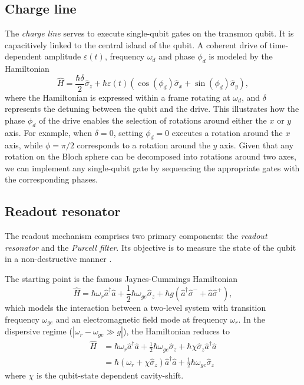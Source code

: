 \subsection{Charge line}

The \emph{charge line} serves to execute single-qubit gates on the transmon qubit.
It is capacitively linked to the central island of the qubit.
A coherent drive of time-dependent amplitude $\varepsilon(t)$, frequency $\omega_d$ and phase $\phi_d$ is modeled by the Hamiltonian \cite{LC_resonator}
\begin{equation}
    \hat{H} = \frac{\hbar \delta}{2} \hat{\sigma}_z + 
    \hbar \varepsilon(t) \left( \cos(\phi_d) \hat{\sigma}_x + \sin(\phi_d) \hat{\sigma}_y \right) ,
\end{equation}
where the Hamiltonian is expressed within a frame rotating at $\omega_d$, and $\delta$ represents the detuning between the qubit and the drive. 
This illustrates how the phase $\phi_d$ of the drive enables the selection of rotations around either the $x$ or $y$ axis. 
For example, when $\delta = 0$, setting $\phi_d = 0$ executes a rotation around the $x$ axis, while $\phi = \pi/2$ corresponds to a rotation around the $y$ axis. 
Given that any rotation on the Bloch sphere can be decomposed into rotations around two axes, we can implement any single-qubit gate by sequencing the appropriate gates with the corresponding phases.

\subsection{Readout resonator}

The readout mechanism comprises two primary components: the \emph{readout resonator} and the \emph{Purcell filter}. 
Its objective is to measure the state of the qubit in a non-destructive manner \cite{singleshot_readout}.

The starting point is the famous Jaynes-Cummings Hamiltonian \cite{haroche2006exploring}
\begin{equation}
    \hat{H} = \hbar \omega_r \hat{a}^\dagger \hat{a} + \frac{1}{2} \hbar \omega_{ge} \hat{\sigma}_z + \hbar g (\hat{a}^\dagger \hat{\sigma}^- + \hat{a} \hat{\sigma}^+) ,
\end{equation}
which models the interaction between a two-level system with transition frequency $\omega_{ge}$ and an electromagnetic field mode at frequency $\omega_r$.
In the dispersive regime ($|\omega_r - \omega_{ge} \gg g|$), the Hamiltonian reduces to \cite{transmon_regime}
\begin{align}
    \hat{H} &= \hbar \omega_r \hat{a}^\dagger \hat{a} + \frac{1}{2} \hbar \omega_{ge} \hat{\sigma}_z + \hbar \chi \hat{\sigma}_z \hat{a}^\dagger \hat{a} \\
    &= \hbar (\omega_r + \chi \hat{\sigma}_z ) \hat{a}^\dagger \hat{a} +
    \frac{1}{2} \hbar \omega_{ge} \hat{\sigma}_z 
\end{align}
where $\chi$ is the qubit-state dependent cavity-shift.

